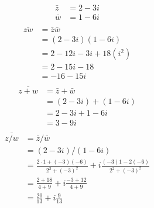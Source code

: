 

\begin{align*}
  \bar{z} &= 2-3i\\
  \bar{w} &= 1-6i\\
\end{align*}
\begin{align*}
  \bar{zw}&=\bar{z}\bar{w}\\
          &=(2-3i)(1-6i)\\
          &=2-12i-3i+18(i^2)\\
          &=2-15i-18\\
          &=-16-15i\\
\end{align*}
\begin{align*}
  \bar{z+w} &= \bar{z}+\bar{w}\\
            &= (2-3i) + (1-6i)\\
            &= 2-3i +1-6i\\
            &=3-9i\\
\end{align*}
\begin{align*}
  \bar{z/w} &= \bar{z}/\bar{w}\\
            &= (2-3i)/(1-6i)\\
            &= \frac{2\cdot 1 + (-3)(-6)}{2^2+(-3)^2} + i\frac{(-3)1-2(-6)}{2^2+(-3)^2}\\
            &= \frac{2+ 18}{4+9} + i\frac{-3+12}{4+9}\\
            &= \frac{20}{13} + i\frac{9}{13}\\
\end{align*}




